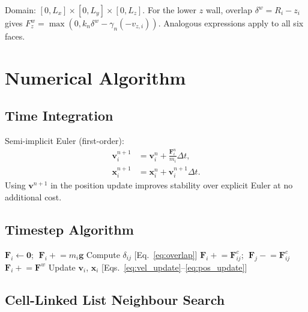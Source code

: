 \documentclass[10pt,twocolumn]{article}
\newcommand{\vv}[1]{\boldsymbol{#1}}
\begin{document}
Domain: $[0,L_x]\times[0,L_y]\times[0,L_z]$.
For the lower $z$ wall, overlap $\delta^w=R_i-z_i$ gives
$F^w_z=\max(0,k_n\delta^w-\gamma_n(-v_{z,i}))$.
Analogous expressions apply to all six faces.

\section{Numerical Algorithm}\label{sec:algo}

\subsection{Time Integration}

Semi-implicit Euler (first-order):
\begin{align}
  \vv{v}^{n+1}_i &= \vv{v}^n_i + \frac{\vv{F}^n_i}{m_i}\Delta t,
  \label{eq:vel_update}\\
  \vv{x}^{n+1}_i &= \vv{x}^n_i + \vv{v}^{n+1}_i\Delta t.
  \label{eq:pos_update}
\end{align}
Using $\vv{v}^{n+1}$ in the position update improves stability over
explicit Euler at no additional cost.

\subsection{Timestep Algorithm}

\begin{algorithm}[H]
\small
\caption{Single DEM Timestep}\label{alg:timestep}
\begin{algorithmic}[1]
    \State $\vv{F}_i\!\leftarrow\!\vv{0}$;
           $\;\vv{F}_i\!\mathrel{+}=\!m_i\vv{g}$
  \EndFor
    \State Compute $\delta_{ij}$ [Eq.~\eqref{eq:overlap}]
      \State $\vv{F}_i\mathrel{+}=\vv{F}^c_{ij}$;
             $\;\vv{F}_j\mathrel{-}=\vv{F}^c_{ij}$
    \EndIf
  \EndFor
    \State $\vv{F}_i\mathrel{+}=\vv{F}^w$
  \EndFor
    \State Update $\vv{v}_i$, $\vv{x}_i$
           [Eqs.~\eqref{eq:vel_update}--\eqref{eq:pos_update}]
  \EndFor
\end{algorithmic}
\end{algorithm}

\subsection{Cell-Linked List Neighbour Search}
\end{document}
